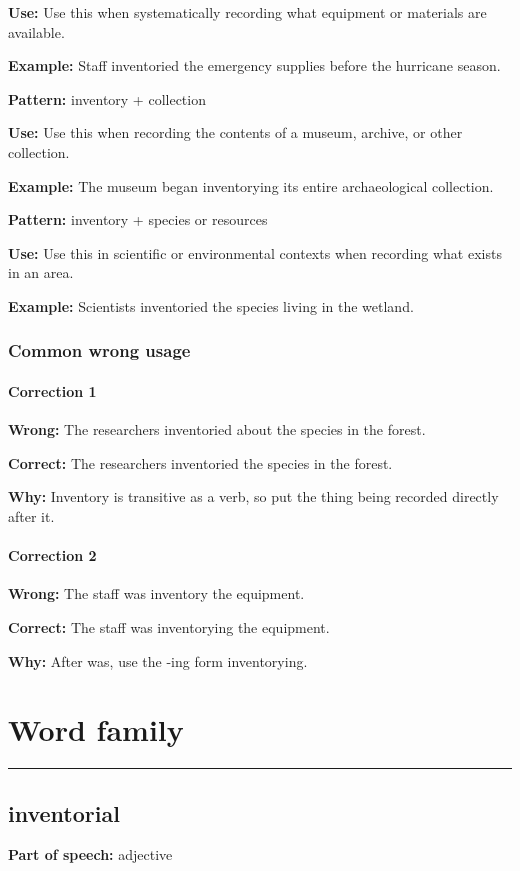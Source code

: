 \documentclass[11pt]{article}
\newcommand{\sectionrule}{\par\vspace{-0.5em}\noindent\textcolor{Accent}{\rule{\linewidth}{0.6pt}}\par}
\begin{document}
\textbf{Use:} Use this when systematically recording what equipment or materials are available.

\textbf{Example:} Staff inventoried the emergency supplies before the hurricane season.

\textbf{Pattern:} inventory + collection

\textbf{Use:} Use this when recording the contents of a museum, archive, or other collection.

\textbf{Example:} The museum began inventorying its entire archaeological collection.

\textbf{Pattern:} inventory + species or resources

\textbf{Use:} Use this in scientific or environmental contexts when recording what exists in an area.

\textbf{Example:} Scientists inventoried the species living in the wetland.

\subsubsection{Common wrong usage}
\paragraph{Correction 1}
\textbf{Wrong:} The researchers inventoried about the species in the forest.

\textbf{Correct:} The researchers inventoried the species in the forest.

\textbf{Why:} Inventory is transitive as a verb, so put the thing being recorded directly after it.

\paragraph{Correction 2}
\textbf{Wrong:} The staff was inventory the equipment.

\textbf{Correct:} The staff was inventorying the equipment.

\textbf{Why:} After was, use the -ing form inventorying.

\section{Word family}
\sectionrule
\subsection{inventorial}
\textbf{Part of speech:} adjective
\end{document}

